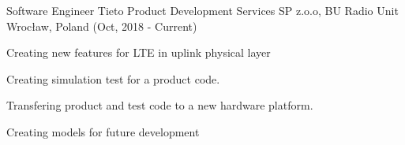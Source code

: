 \begin{cventries}
  \cventry
    {Software Engineer}
    {Tieto Product Development Services SP z.o.o, BU Radio Unit}
    {Wrocław, Poland}
    (Oct, 2018 - Current)
    {
      \begin{cvitems}
        \item {Creating new features for LTE in uplink physical layer}
        \item {Creating simulation test for a product code.}
        \item {Transfering product and test code to a new hardware platform.}
        \item {Creating models for future development}
      \end{cvitems}
    }

\end{cventries}
